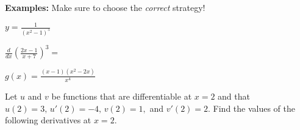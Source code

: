 \noindent\textbf{Examples:} Make sure to choose the \textit{correct} strategy!
\begin{questions}
    \begin{minipage}{0.45\linewidth}
    \question $\displaystyle y=\frac{1}{(x^2-1)^5}$
    \end{minipage}
    \hfill
    \begin{minipage}{0.45\linewidth}
    \question $\displaystyle\frac{d}{dx}\left(\frac{2x-1}{x+7}\right)^3=$
    \end{minipage}
    
    \newpage
    
    \question $\displaystyle g(x)=\frac{(x-1)(x^2-2x)}{x^4}$
    
    \question Let $u$ and $v$ be functions that are differentiable at $x=2$ and that $u(2)=3,\,u'(2)=-4,\,v(2)=1,$ and $v'(2)=2$. Find the values of the following derivatives at $x=2$.
    
\end{questions}



\newpage
